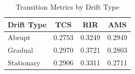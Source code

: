 \begin{table}[htbp]
\centering
\caption{Transition Metrics by Drift Type}
\label{tab:transition_metrics}
\begin{tabular}{lccc}
\toprule
Drift Type & TCS & RIR & AMS \\
\midrule
Abrupt & 0.2753 & 0.3249 & 0.2949 \\
Gradual & 0.2970 & 0.3721 & 0.2803 \\
Stationary & 0.2906 & 0.3311 & 0.2711 \\
\bottomrule
\end{tabular}
\end{table}